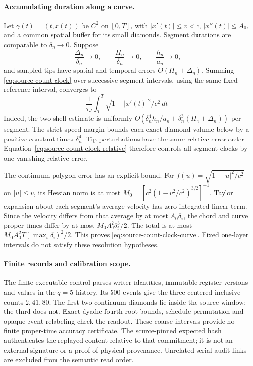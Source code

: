 \paragraph{Accumulating duration along a curve.}
Let $\gamma(t)=(t,x(t))$ be $C^2$ on $[0,T]$, with
$|x'(t)|\leq v<c$, $|x''(t)|\leq A_0$, and a common spatial buffer for
its small diamonds. Segment durations are comparable to
$\delta_n\to0$. Suppose
\[
 \frac{\Delta_n}{\delta_n}\to0,\qquad
 \frac{H_n}{\delta_n}\to0,\qquad
 \frac{h_n}{a_n}\to0,
\]
and sampled tips have spatial and temporal errors $O(H_n+\Delta_n)$.
Summing \eqref{eq:source-count-clock} over successive segment intervals,
using the same fixed reference interval, converges to
\begin{equation}
 \frac1{\tau_J}\int_0^T\sqrt{1-|x'(t)|^2/c^2}\,dt.
 \label{eq:source-count-clock-curve}
\end{equation}
Indeed, the two-shell estimate is uniformly
$O(\delta_n^4h_n/a_n+\delta_n^3(H_n+\Delta_n))$ per segment.
The strict speed margin bounds each exact diamond volume below by a
positive constant times $\delta_n^4$. Tip perturbations have the same
relative error order. Equation~\eqref{eq:source-count-clock-relative}
therefore controls all segment clocks by one vanishing relative error.

The continuum polygon error has an explicit bound. For
$f(u)=\sqrt{1-|u|^2/c^2}$ on $|u|\leq v$, its Hessian norm is at most
$M_0=[c^2(1-v^2/c^2)^{3/2}]^{-1}$. Taylor expansion about each segment's
average velocity has zero integrated linear term. Since the velocity
differs from that average by at most $A_0\delta_i$, the chord and curve
proper times differ by at most $M_0A_0^2\delta_i^3/2$. The total is at
most $M_0A_0^2T(\max_i\delta_i)^2/2$. This proves
\eqref{eq:source-count-clock-curve}. Fixed one-layer intervals do not
satisfy these resolution hypotheses.

\paragraph{Finite records and calibration scope.}
The finite executable control parses writer identities, immutable
register versions and values in the $q=5$ history. Its $500$ events give
the three centered inclusive counts $2,41,80$. The first two continuum
diamonds lie inside the source window; the third does not. Exact dyadic
fourth-root bounds, schedule permutation and opaque event relabeling
check the readout. These coarse intervals provide no finite proper-time
accuracy certificate. The source-pinned expected hash authenticates the
replayed content relative to that commitment; it is not an external
signature or a proof of physical provenance. Unrelated serial audit
links are excluded from the semantic read order.

